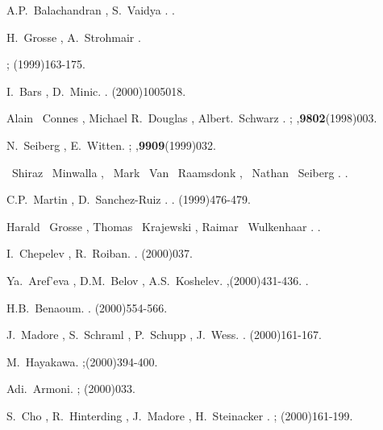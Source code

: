 \documentclass[a4paper,12pt]{article}
\begin{document}
\begin{thebibliography}{10}
A.P.~Balachandran , S.~Vaidya .
.

H.~Grosse , A.~Strohmair .

;
(1999)163-175.


I.~Bars , D.~Minic.
.
(2000)1005018.







Alain ~Connes , Michael R.~Douglas , Albert.~Schwarz .
;
,{\bf 9802}(1998)003.

N.~Seiberg , E.~Witten.
;
,{\bf 9909}(1999)032.




~Shiraz ~Minwalla , ~Mark ~Van ~Raamsdonk , ~Nathan ~Seiberg .
.

C.P.~Martin , D.~Sanchez-Ruiz .
.
(1999)476-479.

Harald ~Grosse , Thomas ~Krajewski , Raimar ~Wulkenhaar .
.

I.~Chepelev , R.~Roiban.
.
(2000)037.

Ya.~Aref'eva , D.M.~Belov , A.S.~Koshelev.
,(2000)431-436.
.

H.B.~Benaoum.
.
(2000)554-566.

J.~Madore , S.~Schraml , P.~Schupp , J.~Wess.
.
(2000)161-167.

M.~Hayakawa.
;(2000)394-400.

Adi.~Armoni.
;
(2000)033.

S.~Cho , R.~Hinterding , J.~Madore , H.~Steinacker .
;
(2000)161-199.


\end{thebibliography}
\end{document}
